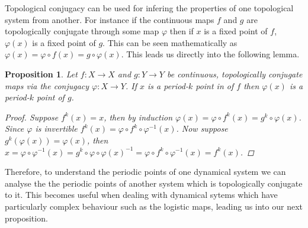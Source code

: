 \documentclass[11pt,a4paper,oneside]{memoir}
\theoremstyle{plain}
\newtheorem{prop}[thm]{Proposition}
\theoremstyle{definition}
\begin{document}
\begin{center}
\end{center}

Topological conjugacy can be used for infering the properties of one topological system from another. For instance if the continuous maps $f$ and $g$ are topologically conjugate through some map $\varphi$ then if $x$ is a fixed point of $f$, $\varphi(x)$ is a fixed point of $g$. This can be seen mathematically as $\varphi(x) = \varphi \circ f(x) = g \circ \varphi(x)$. This leads us directly into the following lemma.

\begin{prop}
    Let $f: X \to X$ and $g: Y \to Y$ be continuous, topologically conjugate maps via the conjugacy $\varphi: X \to Y$. If $x$ is a period-$k$ point in of $f$ then $\varphi(x)$ is a period-$k$ point of $g$.
    \begin{proof}
        Suppose $f^k(x) = x$, then by induction $\varphi(x) = \varphi \circ f^k(x) = g^k \circ \varphi (x)$. Since $\varphi$ is invertible $f^k(x) = \varphi \circ f^k \circ \varphi^{-1}(x)$. Now suppose $g^k(\varphi(x)) = \varphi(x)$, then $x = \varphi \circ \varphi^{-1}(x) = g^k \circ \varphi \circ \varphi(x)^{-1} = \varphi \circ f^k \circ \varphi^{-1}(x) = f^k(x)$.
    \end{proof}
\end{prop}

Therefore, to understand the periodic points of one dynamical system we can analyse the the periodic points of another system which is topologically conjugate to it. This becomes useful when dealing with dynamical sytems which have particularly complex behaviour such as the logistic maps, leading us into our next proposition.
\end{document}
